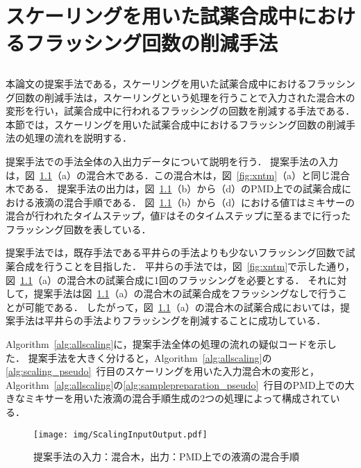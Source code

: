 \chapter{スケーリングを用いた試薬合成中におけるフラッシング回数の削減手法}
\section{}
本論文の提案手法である，スケーリングを用いた試薬合成中におけるフラッシング回数の削減手法は，スケーリングという処理を行うことで入力された混合木の変形を行い，試薬合成中に行われるフラッシングの回数を削減する手法である．
本節では，スケーリングを用いた試薬合成中におけるフラッシング回数の削減手法の処理の流れを説明する．

提案手法での手法全体の入出力データについて説明を行う．
提案手法の入力は，図~\ref{fig:ScalingInputOutput}（a）の混合木である．この混合木は，図~\ref{fig:xntm}（a）と同じ混合木である．
提案手法の出力は，図~\ref{fig:ScalingInputOutput}（b）から（d）のPMD上での試薬合成における液滴の混合手順である．
図~\ref{fig:ScalingInputOutput}（b）から（d）における値Tはミキサーの混合が行われたタイムステップ，値Fはそのタイムステップに至るまでに行ったフラッシング回数を表している．

提案手法では，既存手法である平井らの手法よりも少ないフラッシング回数で試薬合成を行うことを目指した．
平井らの手法では，図~\ref{fig:xntm}で示した通り，図~\ref{fig:ScalingInputOutput}（a）の混合木の試薬合成に1回のフラッシングを必要とする．
それに対して，提案手法は図~\ref{fig:ScalingInputOutput}（a）の混合木の試薬合成をフラッシングなしで行うことが可能である．
したがって，図~\ref{fig:ScalingInputOutput}（a）の混合木の試薬合成においては，提案手法は平井らの手法よりフラッシングを削減することに成功している．

Algorithm~\ref{alg:allscaling}に，提案手法全体の処理の流れの疑似コードを示した．
提案手法を大きく分けると，Algorithm~\ref{alg:allscaling}の\ref{alg:scaling_pseudo}~行目のスケーリングを用いた入力混合木の変形と，Algorithm~\ref{alg:allscaling}の\ref{alg:samplepreparation_pseudo}~行目のPMD上での大きなミキサーを用いた液滴の混合手順生成の2つの処理によって構成されている．

\begin{figure}[tbp]
 \centering\texttt{[image: img/ScalingInputOutput.pdf]}
 \caption{提案手法の入力：混合木，出力：PMD上での液滴の混合手順}\label{fig:ScalingInputOutput}
\end{figure}

